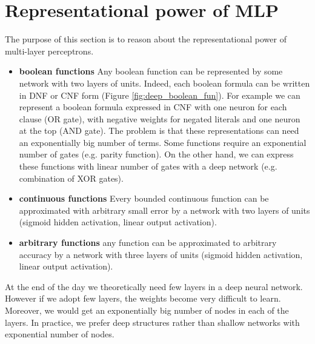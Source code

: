 \section{Representational power of MLP}
The purpose of this section is to reason about the representational power of
multi-layer perceptrons.
\begin{itemize}
	\item \textbf{boolean functions} Any boolean function can be represented by
		some network with two layers of units. Indeed, each boolean formula can be
		written in DNF or CNF form (Figure \ref{fig:deep_boolean_fun}). For example we
		can represent a boolean formula expressed in CNF with one neuron for each clause
		(OR gate), with negative weights for negated literals and one neuron at the
		top (AND gate). The problem is that these representations can need an exponentially
		big number of terms. Some functions require an exponential number of gates (e.g.
		parity function). On the other hand, we can express these functions with linear
		number of gates with a deep network (e.g. combination of XOR gates).

	\item \textbf{continuous functions} Every bounded continuous function can be
		approximated with arbitrary small error by a network with two layers of
		units (sigmoid hidden activation, linear output activation).

	\item \textbf{arbitrary functions} any function can be approximated to
		arbitrary accuracy by a network with three layers of units (sigmoid hidden activation,
		linear output activation).
\end{itemize}

At the end of the day we theoretically need few layers in a deep neural network.
However if we adopt few layers, the weights become very difficult to learn. Moreover,
we would get an exponentially big number of nodes in each of the layers. In practice,
we prefer deep structures rather than shallow networks with exponential number
of nodes.

